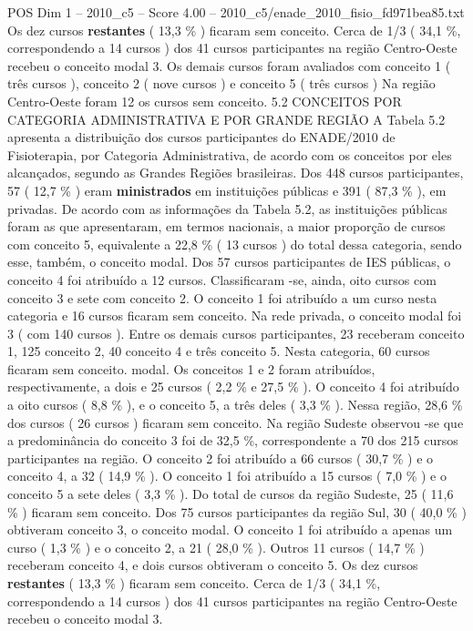 \begin{textsample}{POS Dim 1 – 2010\_c5 – Score 4.00 – 2010\_c5/enade\_2010\_fisio\_fd971bea85.txt}
Os dez cursos \textbf{restantes} ( 13,3 \% ) ficaram sem conceito.
Cerca de 1/3 ( 34,1 \%, correspondendo a 14 cursos ) dos 41 cursos participantes na região Centro-Oeste recebeu o conceito modal 3.
Os demais cursos foram avaliados com conceito 1 ( três cursos ), conceito 2 ( nove cursos ) e conceito 5 ( três cursos ) Na região Centro-Oeste foram 12 os cursos sem conceito. 5.2 CONCEITOS POR CATEGORIA ADMINISTRATIVA E POR GRANDE REGIÃO A Tabela 5.2 apresenta a distribuição dos cursos participantes do ENADE/2010 de Fisioterapia, por Categoria Administrativa, de acordo com os conceitos por eles alcançados, segundo as Grandes Regiões brasileiras.
Dos 448 cursos participantes, 57 ( 12,7 \% ) eram \textbf{ministrados} em instituições públicas e 391 ( 87,3 \% ), em privadas.
De acordo com as informações da Tabela 5.2, as instituições públicas foram as que apresentaram, em termos nacionais, a maior proporção de cursos com conceito 5, equivalente a 22,8 \% ( 13 cursos ) do total dessa categoria, sendo esse, também, o conceito modal.
Dos 57 cursos participantes de IES públicas, o conceito 4 foi atribuído a 12 cursos.
Classificaram -se, ainda, oito cursos com conceito 3 e sete com conceito 2.
O conceito 1 foi atribuído a um curso nesta categoria e 16 cursos ficaram sem conceito.
Na rede privada, o conceito modal foi 3 ( com 140 cursos ).
Entre os demais cursos participantes, 23 receberam conceito 1, 125 conceito 2, 40 conceito 4 e três conceito 5.
Nesta categoria, 60 cursos ficaram sem conceito. modal.
Os conceitos 1 e 2 foram atribuídos, respectivamente, a dois e 25 cursos ( 2,2 \% e 27,5 \% ).
O conceito 4 foi atribuído a oito cursos ( 8,8 \% ), e o conceito 5, a três deles ( 3,3 \% ).
Nessa região, 28,6 \% dos cursos ( 26 cursos ) ficaram sem conceito.
Na região Sudeste observou -se que a predominância do conceito 3 foi de 32,5 \%, correspondente a 70 dos 215 cursos participantes na região.
O conceito 2 foi atribuído a 66 cursos ( 30,7 \% ) e o conceito 4, a 32 ( 14,9 \% ).
O conceito 1 foi atribuído a 15 cursos ( 7,0 \% ) e o conceito 5 a sete deles ( 3,3 \% ).
Do total de cursos da região Sudeste, 25 ( 11,6 \% ) ficaram sem conceito.
Dos 75 cursos participantes da região Sul, 30 ( 40,0 \% ) obtiveram conceito 3, o conceito modal.
O conceito 1 foi atribuído a apenas um curso ( 1,3 \% ) e o conceito 2, a 21 ( 28,0 \% ).
Outros 11 cursos ( 14,7 \% ) receberam conceito 4, e dois cursos obtiveram o conceito 5.
Os dez cursos \textbf{restantes} ( 13,3 \% ) ficaram sem conceito.
Cerca de 1/3 ( 34,1 \%, correspondendo a 14 cursos ) dos 41 cursos participantes na região Centro-Oeste recebeu o conceito modal 3.

\end{textsample}
